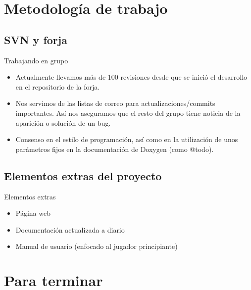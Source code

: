 \documentclass[9pt,xcolor=svgnames]{beamer}
\begin{document}
  
 \section{Metodología de trabajo}
 
  \subsection{SVN y forja}

  \begin{frame}{Trabajando en grupo}
   
   \begin{itemize}
    \item Actualmente llevamos más de 100 revisiones desde que se inició
	  el desarrollo en el repositorio de la forja.
	  
    \item Nos servimos de las listas de correo para
	  actualizaciones/commits importantes. Así nos aseguramos que el
	  resto del grupo tiene noticia de la aparición o solución de un
	  bug.
	  
    \item Consenso en el estilo de programación, así como en la
	  utilización de unos parámetros fijos en la documentación de
	  Doxygen (como @todo).
   \end{itemize}
  \end{frame}
  
  
  \subsection{Elementos extras del proyecto}
  
  \begin{frame}{Elementos extras}
   \begin{itemize}
    \item Página web
    \item Documentación actualizada a diario
    \item Manual de usuario (enfocado al jugador principiante)
   \end{itemize}
  \end{frame}

 \section{Para terminar}
  

  
\end{document}
